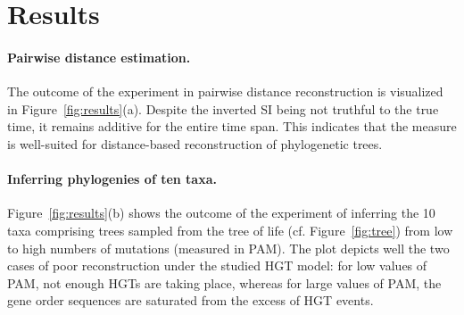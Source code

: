 \documentclass[9pt,english,utf8]{article}
\begin{document}
\FloatBarrier

\section*{Results}


\paragraph{Pairwise distance estimation.} The outcome of the experiment in
pairwise distance reconstruction is visualized in Figure~\ref{fig:results}(a).
Despite the inverted SI being not truthful to the true time, it remains
additive for the entire time span. This indicates that the measure is
well-suited for distance-based reconstruction of phylogenetic trees. 


\paragraph{Inferring phylogenies of ten taxa.} Figure~\ref{fig:results}(b)
shows the outcome of the experiment of inferring the 10 taxa comprising trees
sampled from the tree of life (cf.  Figure~\ref{fig:tree}) from low to high
numbers of mutations (measured in PAM).  The plot depicts well the two cases of
poor reconstruction under the studied HGT model: for low values of PAM, not
enough HGTs are taking place, whereas for large values of PAM, the gene order
sequences are saturated from the excess of HGT events. 
\end{document}
